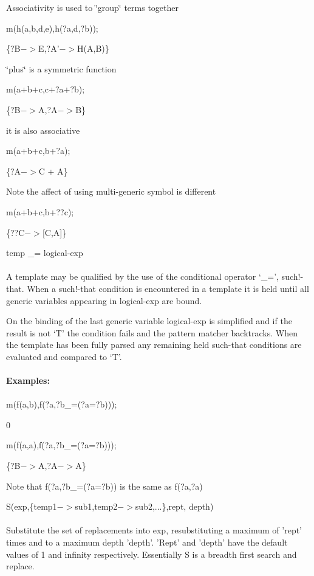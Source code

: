  Associativity is used to \char`\"{}group\char`\"{} terms together

 m(h(a,b,d,e),h(?a,d,?b));

 \{?B$->$E,?A'$->$H(A,B)\}



 \char`\"{}plus\char`\"{} is a symmetric function

 m(a+b+c,c+?a+?b);

 \{?B$->$A,?A$->$B\}



 it is also associative

 m(a+b+c,b+?a);

 \{?A$->$C + A\}



 Note the affect of using multi-generic symbol is different

 m(a+b+c,b+??c);

 \{??C$->${[}C,A{]}\}



temp \_= logical-exp \\
\ \\
A template may be qualified by the use of the conditional operator `\_=',
such!-that. When a such!-that condition is encountered in a template it
is held until all generic variables appearing in logical-exp are bound.

On the binding of the last generic variable logical-exp is simplified
and if the result is not `T' the condition fails and the pattern matcher
backtracks. When the template has been fully parsed any remaining held
such-that conditions are evaluated and compared to `T'. \\
\ \\
{\bf Examples:} \\
\ \\
 m(f(a,b),f(?a,?b\_=(?a=?b)));

 0


 m(f(a,a),f(?a,?b\_=(?a=?b)));

 \{?B$->$A,?A$->$A\}



 Note that f(?a,?b\_=(?a=?b)) is the same as f(?a,?a)



S(exp,\{temp1$->$sub1,temp2$->$sub2,...\},rept, depth) \\
\ \\
Substitute the set of replacements into exp, resubstituting a maximum of
'rept' times and to a maximum depth 'depth'. 'Rept' and 'depth' have the
default values of 1 and infinity respectively. Essentially S is a
breadth first search and replace.

